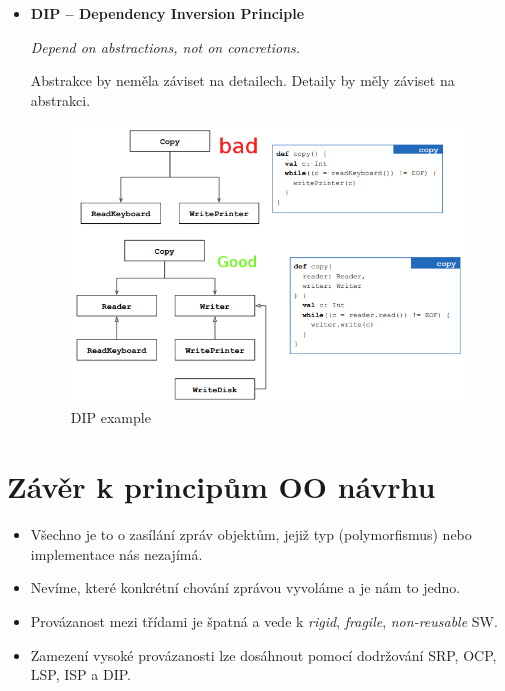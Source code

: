 \documentclass{szzclass}
\begin{document}
\begin{itemize}
      \item \textbf{DIP -- Dependency Inversion Principle}

      \textit{Depend on abstractions, not on concretions.}

      Abstrakce by neměla záviset na detailech. Detaily by měly záviset na abstrakci.
      \begin{figure}[ht]
            \centering
            \includegraphics[width=1\textwidth]{topics/bi-wsi-si-9/dip.png}
            \caption{DIP example}
      \end{figure}


\end{itemize}

\section{Závěr k principům OO návrhu}

\begin{itemize}
      \item Všechno je to o zasílání zpráv objektům, jejiž typ (polymorfismus) nebo implementace nás nezajímá.
      \item Nevíme, které konkrétní chování zprávou vyvoláme a je nám to jedno.
      \item Provázanost mezi třídami je špatná a vede k \textit{rigid}, \textit{fragile}, \textit{non-reusable} SW.
      \item Zamezení vysoké provázanosti lze dosáhnout pomocí dodržování SRP, OCP, LSP, ISP a DIP.
\end{itemize}
\end{document}

